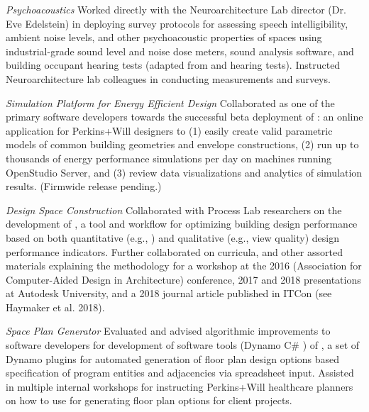 \documentclass[letterpaper, oneside, 10pt]{article}
\begin{document}
\textit{Psychoacoustics}\DotSep{0.25em}
Worked directly with the Neuroarchitecture Lab director (Dr. Eve
Edelstein) in deploying survey protocols for assessing speech
intelligibility, ambient noise levels, and other psychoacoustic properties
of spaces using industrial-grade sound level and noise dose meters, sound
analysis software, and building occupant hearing tests (adapted from
 and  hearing tests). Instructed
Neuroarchitecture lab colleagues in conducting measurements and surveys.



\textit{%
  Simulation Platform for Energy Efficient Design %
}\DotSep{0.25em}%
Collaborated as one of the primary software developers towards the
successful beta deployment of : an online application
for Perkins+Will designers to (1) easily create valid parametric models of
common building geometries and envelope constructions, (2) run up to
thousands of energy performance simulations per day on 
machines running OpenStudio Server, and (3) review 
data visualizations and analytics of simulation results. (Firmwide release
pending.)


\textit{Design Space Construction } \DotSep{0.25em}
Collaborated with Process Lab researchers on the development of , a
tool and workflow for optimizing building design performance based on both
quantitative (e.g., ) and qualitative (e.g., view quality) design
performance indicators. Further collaborated on curricula, and other
assorted materials explaining the  methodology for a workshop at
the 2016  (Association for Computer-Aided Design in Architecture)
conference, 2017 and 2018 presentations at Autodesk University, and a 2018
journal article published in ITCon (see Haymaker et al. 2018).

\hfill
\vspace{3pt}

\textit{Space Plan Generator } \DotSep{0.25em}
Evaluated and advised algorithmic improvements to software developers for
development of software tools (Dynamo C\# ) of
, a set of Dynamo plugins for automated generation of
floor plan design options based specification of program entities and
adjacencies via spreadsheet input. Assisted in multiple internal workshops
for instructing Perkins+Will healthcare planners on how to use
 for generating floor plan options for client projects.
\end{document}
